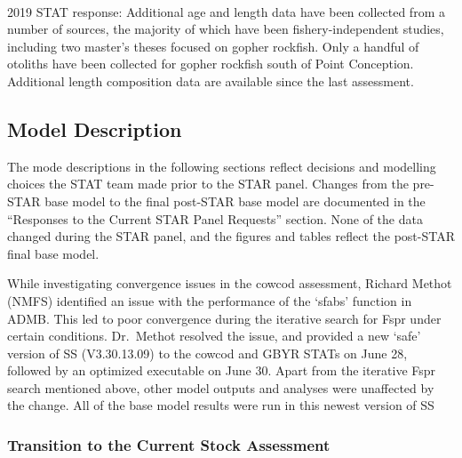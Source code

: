 \documentclass[12pt,]{article}
\begin{document}
\begin{description}[style=unboxed]

  \item[Recommendation 1: Additional length and age composition data should be 
  collected for gopher rockfish. This would help to characterize spatial and possibly 
  temporal variation in growth] \hfill \\

   2019 STAT response: Additional age and length data have been collected from a number of 
   sources, the majority of which have been fishery-independent studies, including 
   two master's theses focused on gopher rockfish.  Only a handful of otoliths have been 
   collected for gopher rockfish south of Point Conception.  Additional length composition 
   data are available since the last assessment.
   
\end{description}

\subsection{Model Description}\label{model-description}

The mode descriptions in the following sections reflect decisions and
modelling choices the STAT team made prior to the STAR panel. Changes
from the pre-STAR base model to the final post-STAR base model are
documented in the ``Responses to the Current STAR Panel Requests''
section. None of the data changed during the STAR panel, and the figures
and tables reflect the post-STAR final base model.

While investigating convergence issues in the cowcod assessment, Richard
Methot (NMFS) identified an issue with the performance of the `sfabs'
function in ADMB. This led to poor convergence during the iterative
search for Fspr under certain conditions. Dr.~Methot resolved the issue,
and provided a new `safe' version of SS (V3.30.13.09) to the cowcod and
GBYR STATs on June 28, followed by an optimized executable on June 30.
Apart from the iterative Fspr search mentioned above, other model
outputs and analyses were unaffected by the change. All of the base
model results were run in this newest version of SS

\subsubsection{Transition to the Current Stock
Assessment}\label{transition-to-the-current-stock-assessment}
\end{document}
